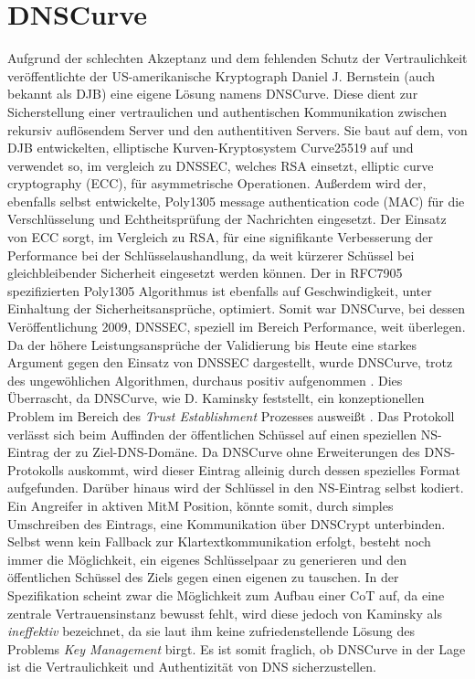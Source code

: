 
\section{DNSCurve}

Aufgrund der schlechten Akzeptanz und dem fehlenden Schutz der Vertraulichkeit veröffentlichte der US-amerikanische Kryptograph Daniel J. Bernstein (auch bekannt als DJB) eine eigene Lösung namens DNSCurve. Diese dient zur Sicherstellung einer vertraulichen und authentischen Kommunikation zwischen rekursiv auflösendem Server und den authentitiven Servers. Sie baut auf dem, von DJB entwickelten, elliptische Kurven-Kryptosystem Curve25519 auf und verwendet so, im vergleich zu DNSSEC, welches RSA einsetzt, elliptic curve cryptography (ECC), für asymmetrische Operationen. Außerdem wird der, ebenfalls selbst entwickelte, Poly1305 message authentication code (MAC) für die Verschlüsselung und Echtheitsprüfung der Nachrichten eingesetzt. Der Einsatz von ECC sorgt, im Vergleich zu RSA, für eine signifikante Verbesserung der Performance bei der Schlüsselaushandlung, da weit kürzerer Schüssel bei gleichbleibender Sicherheit eingesetzt werden können\cite{Gupta2002}. Der in RFC7905 spezifizierten Poly1305 Algorithmus ist ebenfalls auf Geschwindigkeit, unter Einhaltung der Sicherheitsansprüche, optimiert\cite{Bernstein2005}. Somit war DNSCurve, bei dessen Veröffentlichung 2009, DNSSEC, speziell im Bereich Performance, weit überlegen. Da der höhere Leistungsansprüche der Validierung bis Heute eine starkes Argument gegen den Einsatz von DNSSEC dargestellt, wurde DNSCurve, trotz des ungewöhlichen Algorithmen, durchaus positiv aufgenommen \cite{Henry2013}. Dies Überrascht, da DNSCurve, wie D. Kaminsky feststellt, ein konzeptionellen Problem im Bereich des \textit{Trust Establishment} Prozesses ausweißt \cite{Kaminsky2011}. Das Protokoll verlässt sich beim Auffinden der öffentlichen Schüssel auf einen speziellen NS-Eintrag der zu Ziel-DNS-Domäne. Da DNSCurve ohne Erweiterungen des DNS-Protokolls auskommt, wird dieser Eintrag alleinig durch dessen spezielles Format aufgefunden. Darüber hinaus wird der Schlüssel in den NS-Eintrag selbst kodiert. Ein Angreifer in aktiven MitM Position, könnte somit, durch simples Umschreiben des Eintrags, eine Kommunikation über DNSCrypt unterbinden. Selbst wenn kein Fallback zur Klartextkommunikation erfolgt, besteht noch immer die Möglichkeit, ein eigenes Schlüsselpaar zu generieren und den öffentlichen Schüssel des Ziels gegen einen eigenen zu tauschen. In der Spezifikation scheint zwar die Möglichkeit zum Aufbau einer CoT auf, da eine zentrale Vertrauensinstanz bewusst fehlt, wird diese jedoch von Kaminsky als \textit{ineffektiv} bezeichnet, da sie laut ihm keine zufriedenstellende Lösung des Problems \textit{Key Management} birgt. Es ist somit fraglich, ob DNSCurve in der Lage ist die Vertraulichkeit und Authentizität von DNS sicherzustellen.  


